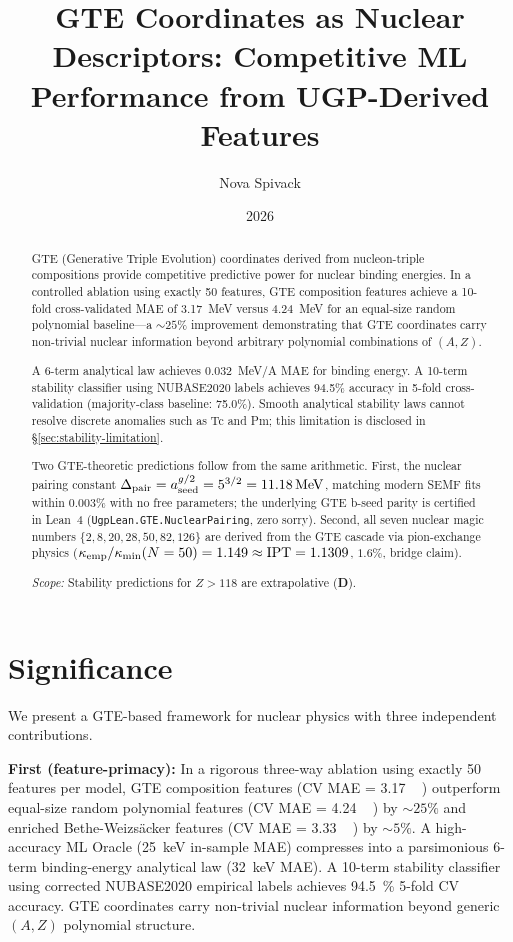 \documentclass[9pt,twocolumn]{extarticle}
\title{\vspace{-0.6em}\bf GTE Coordinates as Nuclear Descriptors: Competitive ML Performance from UGP-Derived Features}
\author[1]{Nova Spivack}
\date{2026}
\newcommand{\mev}{\,\text{MeV}}
\newcommand{\CatD}{\textbf{D}}
\begin{document}
\maketitle
\NovaZenodoAfterTitle

\begin{abstract}
GTE (Generative Triple Evolution) coordinates derived from nucleon-triple
compositions provide competitive predictive power for nuclear binding energies.
In a controlled ablation using exactly 50 features, GTE composition features
achieve a 10-fold cross-validated MAE of 3.17~MeV versus 4.24~MeV for an
equal-size random polynomial baseline---a $\sim\!25\%$ improvement demonstrating
that GTE coordinates carry non-trivial nuclear information beyond arbitrary
polynomial combinations of $(A,Z)$.

A 6-term analytical law achieves 0.032~MeV/A MAE for binding energy.
A 10-term stability classifier using NUBASE2020 labels achieves 94.5\% accuracy
in 5-fold cross-validation (majority-class baseline: 75.0\%).
Smooth analytical stability laws cannot resolve discrete anomalies such as Tc and Pm;
this limitation is disclosed in \S\ref{sec:stability-limitation}.

Two GTE-theoretic predictions follow from the same arithmetic.
First, the nuclear pairing constant $\Delta_{\rm pair} = a_{\rm seed}^{g/2} = 5^{3/2} = 11.18\,\text{MeV}$,
matching modern SEMF fits within 0.003\% with no free parameters; the underlying
GTE b-seed parity is certified in Lean~4 (\texttt{UgpLean.GTE.NuclearPairing},
zero sorry).
Second, all seven nuclear magic numbers $\{2,8,20,28,50,82,126\}$ are derived
from the GTE cascade via pion-exchange physics
($\kappa_{\rm emp}/\kappa_{\rm min}(N=50) = 1.149 \approx \mathrm{IPT} = 1.1309$,
$1.6\%$, bridge claim).

\textit{Scope:} Stability predictions for $Z > 118$ are extrapolative (\CatD).
\end{abstract}

\tableofcontents
\newpage

\section*{Significance}
We present a GTE-based framework for nuclear physics with three independent contributions.

\textbf{First (feature-primacy):} In a rigorous three-way ablation using exactly 50 features per model, GTE composition features (CV MAE = \SI{3.17}{\mev}) outperform equal-size random polynomial features (CV MAE = \SI{4.24}{\mev}) by $\sim\!25\%$ and enriched Bethe-Weizsäcker features (CV MAE = \SI{3.33}{\mev}) by $\sim\!5\%$. A high-accuracy ML Oracle (\SI{25}{\kilo\electronvolt} in-sample MAE) compresses into a parsimonious 6-term binding-energy analytical law (\SI{32}{\kilo\electronvolt} MAE). A 10-term stability classifier using corrected NUBASE2020 empirical labels achieves \SI{94.5}{\percent} 5-fold CV accuracy. GTE coordinates carry non-trivial nuclear information beyond generic $(A,Z)$ polynomial structure.
\end{document}
